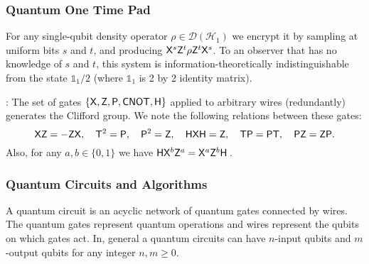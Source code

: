\begin{definition}
\subsubsection*{Quantum One Time Pad}
For any single-qubit density operator $\rho \in \mathcal{D} (\mathcal{H}_1)$ we encrypt it by sampling at uniform bits $s$ and $t$, and producing
 ${\sf X}^s {\sf Z}^t \rho {\sf Z}^t {\sf X}^s$. To an observer that has no knowledge of $s$ and $t$, this system is information-theoretically indistinguishable from the state $\mathds{1}_1/2$ (where $\mathds{1}_1$ is 2 by 2 identity matrix)\cite{AMTW00}.

%

\begin{definition}
\label{defn:Clifford+T:family}
 : The set of gates $\{{\sf X}, {\sf Z}, {\sf P}, {\sf CNOT},{\sf H}\}$ applied to arbitrary wires (redundantly) generates the Clifford group.
We note the following relations between these gates:
$${\sf X}{\sf Z} = - {\sf Z}{\sf X},\quad {\sf T}^2={\sf P},\quad{\sf P}^2={\sf Z},\quad{\sf H}{\sf X}{\sf H}={\sf Z},\quad {\sf T}{\sf P}={\sf P}{\sf T},\quad{\sf P}{\sf Z}={\sf Z}{\sf P}.$$
Also, for any $a,b\in\{0,1\}$ we have
${\sf H}{\sf X}^b{\sf Z}^a={\sf X}^a{\sf Z}^b {\sf H}$\,.
\end{definition}

\subsubsection{Quantum Circuits and Algorithms}
A quantum circuit is an acyclic network of quantum gates connected by wires. The quantum gates represent quantum operations and wires represent the qubits on which gates act. In, general a quantum circuits can have $n$-input qubits and $m$-output qubits for any integer $n,m\geq 0.$


\end{definition}
